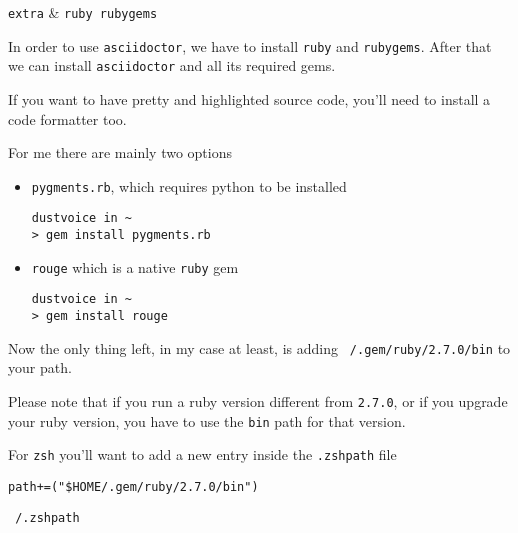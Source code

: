 \documentclass[10pt]{dustdoc}
\begin{document}
\begin{pkgtable}
    \texttt{extra} & \texttt{ruby rubygems} \\
\end{pkgtable}

In order to use \texttt{asciidoctor}, we have to install \texttt{ruby} and \texttt{rubygems}.
After that we can install \texttt{asciidoctor} and all its required gems.

\begin{NOTE}
    If you want to have pretty and highlighted source code, you’ll need to install a code formatter too.

    For me there are mainly two options

    \begin{itemize}
        \item \texttt{pygments.rb}, which requires python to be installed

            \begin{verbatim}
dustvoice in ~
> gem install pygments.rb
            \end{verbatim}


        \item \texttt{rouge} which is a native \texttt{ruby} gem

            \begin{verbatim}
dustvoice in ~
> gem install rouge
            \end{verbatim}

    \end{itemize}
\end{NOTE}

Now the only thing left, in my case at least, is adding \texttt{~/.gem/ruby/2.7.0/bin} to your path.

\begin{NOTE}
    Please note that if you run a ruby version different from \texttt{2.7.0}, or if you upgrade your ruby version, you have to use the \texttt{bin} path for that version.
\end{NOTE}

For \texttt{zsh} you’ll want to add a new entry inside the \texttt{.zshpath} file

\begin{mintedlisting}
    \begin{verbatim}
path+=("$HOME/.gem/ruby/2.7.0/bin")
    \end{verbatim}


    \caption{\texttt{~/.zshpath}}
\end{mintedlisting}
\end{document}
